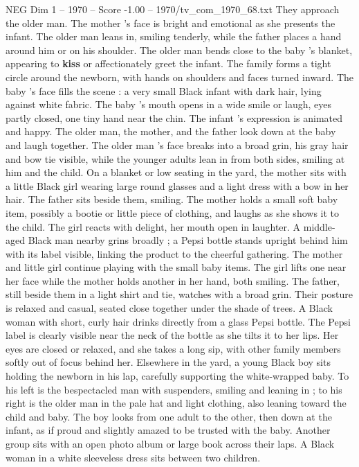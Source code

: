 \begin{textsample}{NEG Dim 1 – 1970 – Score -1.00 – 1970/tv\_com\_1970\_68.txt}
They approach the older man.
The mother ’s face is bright and emotional as she presents the infant.
The older man leans in, smiling tenderly, while the father places a hand around him or on his shoulder.
The older man bends close to the baby ’s blanket, appearing to \textbf{kiss} or affectionately greet the infant.
The family forms a tight circle around the newborn, with hands on shoulders and faces turned inward.
The baby ’s face fills the scene : a very small Black infant with dark hair, lying against white fabric.
The baby ’s mouth opens in a wide smile or laugh, eyes partly closed, one tiny hand near the chin.
The infant ’s expression is animated and happy.
The older man, the mother, and the father look down at the baby and laugh together.
The older man ’s face breaks into a broad grin, his gray hair and bow tie visible, while the younger adults lean in from both sides, smiling at him and the child.
On a blanket or low seating in the yard, the mother sits with a little Black girl wearing large round glasses and a light dress with a bow in her hair.
The father sits beside them, smiling.
The mother holds a small soft baby item, possibly a bootie or little piece of clothing, and laughs as she shows it to the child.
The girl reacts with delight, her mouth open in laughter.
A middle-aged Black man nearby grins broadly ; a Pepsi bottle stands upright behind him with its label visible, linking the product to the cheerful gathering.
The mother and little girl continue playing with the small baby items.
The girl lifts one near her face while the mother holds another in her hand, both smiling.
The father, still beside them in a light shirt and tie, watches with a broad grin.
Their posture is relaxed and casual, seated close together under the shade of trees.
A Black woman with short, curly hair drinks directly from a glass Pepsi bottle.
The Pepsi label is clearly visible near the neck of the bottle as she tilts it to her lips.
Her eyes are closed or relaxed, and she takes a long sip, with other family members softly out of focus behind her.
Elsewhere in the yard, a young Black boy sits holding the newborn in his lap, carefully supporting the white-wrapped baby.
To his left is the bespectacled man with suspenders, smiling and leaning in ; to his right is the older man in the pale hat and light clothing, also leaning toward the child and baby.
The boy looks from one adult to the other, then down at the infant, as if proud and slightly amazed to be trusted with the baby.
Another group sits with an open photo album or large book across their laps.
A Black woman in a white sleeveless dress sits between two children.

\end{textsample}

